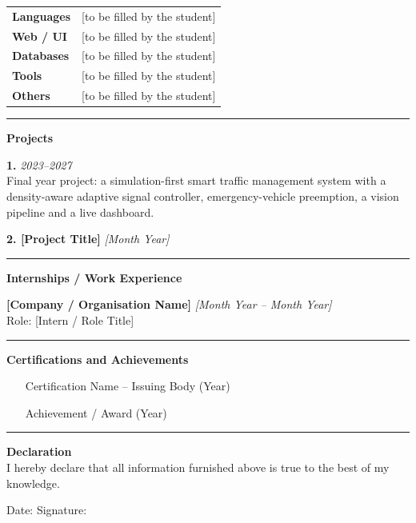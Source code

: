 \begin{tabular}{@{}p{3.5cm}p{9cm}@{}}
\textbf{Languages}   & [to be filled by the student] \\[3pt]
\textbf{Web / UI}    & [to be filled by the student] \\[3pt]
\textbf{Databases}   & [to be filled by the student] \\[3pt]
\textbf{Tools}       & [to be filled by the student] \\[3pt]
\textbf{Others}      & [to be filled by the student] \\
\end{tabular}

\vspace{0.4cm}\hrule\vspace{0.4cm}

\noindent\textbf{Projects}
\vspace{0.2cm}

\noindent\textbf{1. \reporttitle} \hfill \textit{2023--2027}\\
Final year project: a simulation-first smart traffic management system with a density-aware adaptive signal controller, emergency-vehicle preemption, a vision pipeline and a live dashboard.

\noindent\textbf{2. [Project Title]} \hfill \textit{[Month Year]}\\
[Brief one-line description of another project.]

\vspace{0.4cm}\hrule\vspace{0.4cm}

\noindent\textbf{Internships / Work Experience}
\vspace{0.2cm}

\noindent\textbf{[Company / Organisation Name]} \hfill \textit{[Month Year -- Month Year]}\\
Role: [Intern / Role Title]\\
[Brief description of work done.]

\vspace{0.4cm}\hrule\vspace{0.4cm}

\noindent\textbf{Certifications and Achievements}
\begin{itemize}\setlength\itemsep{1pt}
  \item [Certification Name -- Issuing Body (Year)]
  \item [Achievement / Award (Year)]
\end{itemize}

\vspace{0.4cm}\hrule\vspace{0.4cm}

\noindent\textbf{Declaration}\\[3pt]
I hereby declare that all information furnished above is true to the best of
my knowledge.

\vspace{0.6cm}
\noindent Date: \submissiondate \hfill Signature: \underline{\hspace{4cm}}

